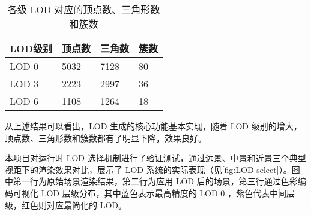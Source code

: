 \begin{table}[H]
    \caption{\label{tab:LOD}各级 LOD 对应的顶点数、三角形数和簇数}
    \begin{tabularx}{\linewidth}{|X<{\centering}|X<{\centering}|X<{\centering}|X<{\centering}|}
        \hline
        LOD级别 & 顶点数 & 三角数 & 簇数 \\ \hline
        LOD 0 & 5032 & 7128 & 80 \\ \hline
        LOD 3 & 2223 & 2997 & 36 \\ \hline
        LOD 6 & 1108 & 1264 & 18 \\ \hline
    \end{tabularx}
\end{table}

从上述结果可以看出，LOD 生成的核心功能基本实现，随着 LOD 级别的增大，顶点数、三角形数和簇数都有了明显下降，效果良好。

本项目对运行时 LOD 选择机制进行了验证测试，通过远景、中景和近景三个典型视距下的渲染效果对比，展示了 LOD 系统的实际表现（见\autoref{fig:LOD select}）。图中第一行为原始场景渲染结果，第二行为应用 LOD 后的场景，第三行通过色彩编码可视化 LOD 层级分布，其中蓝色表示最高精度的 LOD 0 ，紫色代表中间层级，红色则对应最简化的 LOD。

